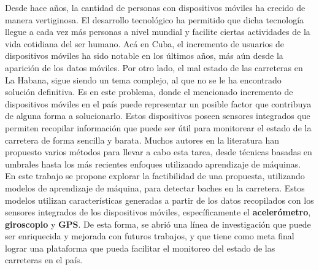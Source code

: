 \begin{resumen}
	Desde hace años, la cantidad de personas con dispositivos móviles ha crecido de manera vertiginosa. El desarrollo
	tecnológico ha permitido que dicha tecnología llegue a cada vez más personas a nivel mundial y facilite ciertas actividades 
	de la vida cotidiana del ser humano. Acá en Cuba, el incremento de usuarios de dispositivos móviles ha sido notable en los últimos
	años, más aún desde la aparición de los datos móviles. Por otro lado, el mal estado de las carreteras en La Habana, sigue siendo un 
	tema complejo, al que no se le ha encontrado solución definitiva. Es en este problema, donde el mencionado incremento de dispositivos
	móviles en el país puede representar un posible factor que contribuya de alguna forma a solucionarlo. Estos dispositivos poseen 
	sensores integrados que permiten recopilar información que puede ser útil para monitorear el estado de la carretera de forma sencilla y 
	barata. Muchos autores en la literatura han propuesto varios métodos para llevar a cabo esta tarea, desde técnicas basadas en umbrales 
	hasta los más recientes enfoques utilizando aprendizaje de máquinas. En este trabajo se propone explorar la factibilidad
	de una propuesta, utilizando modelos de aprendizaje de máquina, para detectar baches en la carretera. Estos modelos utilizan características 
	generadas a partir de los datos recopilados con los sensores integrados de los dispositivos móviles, específicamente el
	\textbf{acelerómetro}, \textbf{giroscopio} y \textbf{GPS}. De esta forma, se abrió una línea de investigación que puede ser enriquecida
	y mejorada con futuros trabajos, y que tiene como meta final lograr una plataforma que pueda facilitar el monitoreo del estado de las
	carreteras en el país.
\end{resumen}


